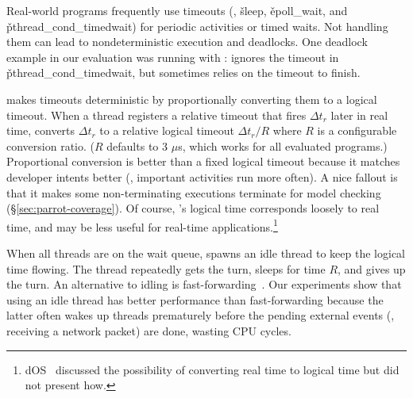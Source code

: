 Real-world programs frequently use timeouts (\eg, \v{sleep},
\v{epoll\_wait}, and \v{pthread\_cond\_timedwait}) for periodic activities
or timed waits.  Not handling them can lead to nondeterministic execution and
deadlocks.  One deadlock example in our evaluation was running \pbzip with
\dthreads: \dthreads ignores the timeout in
\v{pthread\_cond\_timedwait}, but \pbzip sometimes relies on the timeout to finish.

\parrot makes timeouts deterministic by proportionally converting them to a
logical timeout.  When a thread registers a relative timeout that fires
$\Delta t_r$ later in real time, \parrot converts $\Delta t_r$ to a relative
logical timeout $\Delta t_r /R$ where $R$ is a configurable conversion
ratio. ($R$ defaults to 3 $\mu$s, which works for all evaluated programs.)
Proportional conversion is better than a fixed logical timeout because it
matches developer intents better (\eg, important activities
run more often).  A nice fallout is that it makes some
non-terminating executions terminate for model checking
(\S\ref{sec:parrot-coverage}).  Of course, \parrot's logical time corresponds
loosely to real time, and may be less useful for real-time applications.\footnote{
dOS~\cite{dos:osdi10} discussed the possibility of converting real time to
logical time but did not present how.}


When all threads are on the wait queue, \parrot spawns an idle thread to keep the
logical time flowing. The thread repeatedly gets the turn, sleeps for time
$R$, and gives up the turn.  An alternative to idling is
fast-forwarding~\cite{modist:nsdi09,dos:osdi10}.  Our experiments show
that using an idle thread has better performance than fast-forwarding
because the latter often wakes up threads prematurely before the pending
external events (\eg, receiving a network packet) are done, wasting CPU cycles.

